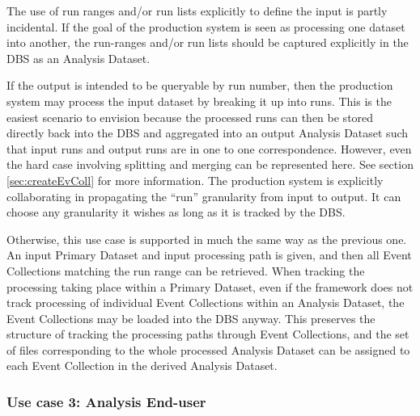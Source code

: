 \documentclass{cmspaper}
\begin{document}
The use of run ranges and/or run lists explicitly to define the input is 
partly incidental. If the goal of the production system is seen as
processing one dataset into another, the run-ranges and/or run lists 
should be captured explicitly in the DBS as an Analysis Dataset. 

If the output is intended to be queryable by run number, then the production 
system may process the input dataset by breaking it up into runs.  This is the 
easiest scenario to envision because the processed runs can then be stored 
directly back into the DBS and aggregated into an output Analysis Dataset such
that input runs and output runs are in one to one correspondence.
However, even the hard case involving splitting and merging can be represented here. 
See section \ref{sec:createEvColl} for more information. 
The production system is explicitly collaborating in propagating the
``run'' granularity from input to output.  It can choose any granularity it 
wishes as long as it is tracked by the DBS.  

Otherwise, this use case is supported in much the same way as the previous one.  An input 
Primary Dataset and input processing path is given, and then all Event Collections
matching the run range can be retrieved.  When tracking the processing
taking place within a Primary Dataset, even if the framework does not track processing
of individual Event Collections within an Analysis Dataset, the Event Collections 
may be loaded into the DBS anyway.  This preserves the structure of tracking 
the processing paths through Event Collections, and the set of 
files corresponding to the whole processed Analysis Dataset can be assigned to 
each Event Collection in the derived Analysis Dataset.  

\subsubsection{Use case 3: Analysis End-user}
\end{document}
